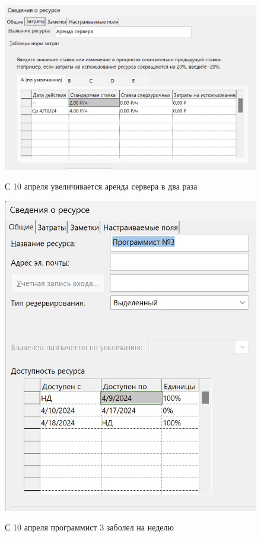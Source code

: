 \begin{figure}[ht!]
	\includegraphics[width=0.75\linewidth]{assets/images/Screenshot 2024-03-09 at 11.32.38.png}
	\label{fig:r2}
	\caption{С 10 апреля увеличивается аренда сервера в два раза}
\end{figure}
\FloatBarrier


\begin{figure}[ht!]
	\includegraphics[width=0.75\linewidth]{assets/images/Screenshot 2024-03-09 at 11.34.40.png}
	\label{fig:r2}
	\caption{С 10 апреля программист 3 заболел на неделю}
\end{figure}
\FloatBarrier

